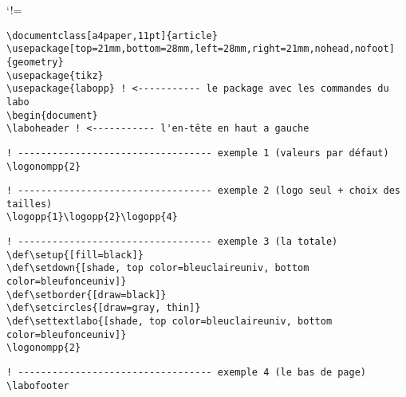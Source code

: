 \documentclass[a4paper,11pt]{article}
\begin{document}
\laboheader

\def\CommentChar{\char37}
\catcode`!=\active
\begin{Verbatim}[defineactive=\def!{\color{orange}\CommentChar}]
\documentclass[a4paper,11pt]{article}
\usepackage[top=21mm,bottom=28mm,left=28mm,right=21mm,nohead,nofoot]{geometry}
\usepackage{tikz}
\usepackage{labopp} ! <----------- le package avec les commandes du labo
\begin{document}
\laboheader ! <----------- l'en-tête en haut a gauche
\end{Verbatim}


\begin{Verbatim}[defineactive=\def!{\color{orange}\CommentChar}]
! ---------------------------------- exemple 1 (valeurs par défaut)
\logonompp{2}
\end{Verbatim}

\begin{Verbatim}[defineactive=\def!{\color{orange}\CommentChar}]
! ---------------------------------- exemple 2 (logo seul + choix des tailles)
\logopp{1}\logopp{2}\logopp{4}
\end{Verbatim}


\begin{Verbatim}[defineactive=\def!{\color{orange}\CommentChar}]
! ---------------------------------- exemple 3 (la totale)
\def\setup{[fill=black]}
\def\setdown{[shade, top color=bleuclaireuniv, bottom color=bleufonceuniv]}
\def\setborder{[draw=black]}
\def\setcircles{[draw=gray, thin]}
\def\settextlabo{[shade, top color=bleuclaireuniv, bottom color=bleufonceuniv]}
\logonompp{2}
\end{Verbatim}
\def\setup{[fill=black]}
\def\setdown{[shade, top color=bleuclaireuniv, bottom color=bleufonceuniv]}
\def\setborder{[draw=black]}
\def\setcircles{[draw=gray, thin]}
\def\settextlabo{[shade, top color=bleuclaireuniv, bottom color=bleufonceuniv]}



\vfill

\begin{Verbatim}[defineactive=\def!{\color{orange}\CommentChar}]
! ---------------------------------- exemple 4 (le bas de page)
\labofooter
\end{Verbatim}
\labofooter

\pagebreak
\end{document}
